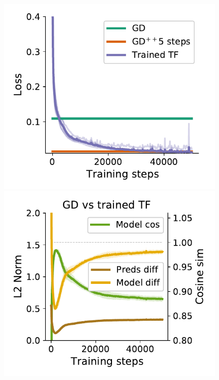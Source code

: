 \documentclass{article}
\theoremstyle{plain}
\theoremstyle{definition}
\theoremstyle{remark}
\begin{document}
\begin{figure}
\begin{center}
\begin{minipage}{.24\textwidth}
  \centering
  \begin{center}
    \includegraphics[width=1.\textwidth]{Final_figures/linear/linear_five_layer/train_1.pdf}
  \end{center}
  \vspace{-10pt}
\end{minipage}
\begin{minipage}{.24\textwidth}
  \centering
  \begin{center}
    \includegraphics[width=1.\textwidth]{Final_figures/linear/linear_five_layer/sim_1.pdf}

\end{center}
\end{minipage}
\end{center}
\end{figure}
\end{document}
